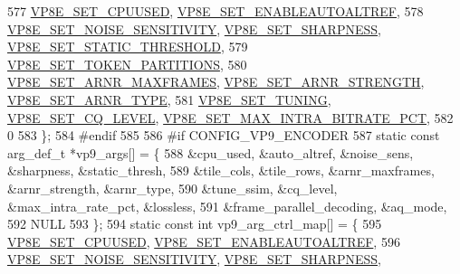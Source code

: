 \begin{DoxyCodeInclude}
{{{{{{{{{577   \hyperlink{group__vp8__encoder_gga6deae3d561c838952552c3d3756322eca953ff0eaa2fcdc2ecd627e449b026853}{VP8E\_SET\_CPUUSED}, \hyperlink{group__vp8__encoder_gga6deae3d561c838952552c3d3756322eca24a5530efabb8b4949d01622b1d72cb0}{VP8E\_SET\_ENABLEAUTOALTREF},
578   \hyperlink{group__vp8__encoder_gga6deae3d561c838952552c3d3756322eca3fa90cb70bade72af3c2d8d91471a36c}{VP8E\_SET\_NOISE\_SENSITIVITY}, \hyperlink{group__vp8__encoder_gga6deae3d561c838952552c3d3756322eca815930923fff388825ee3cc4ef69bb28}{VP8E\_SET\_SHARPNESS}, 
      \hyperlink{group__vp8__encoder_gga6deae3d561c838952552c3d3756322ecab34559df04d3d662616300ed0682dcfd}{VP8E\_SET\_STATIC\_THRESHOLD},
579   \hyperlink{group__vp8__encoder_gga6deae3d561c838952552c3d3756322eca462a4f14f39a6eb5c4a4004fc8d0ad75}{VP8E\_SET\_TOKEN\_PARTITIONS},
580   \hyperlink{group__vp8__encoder_gga6deae3d561c838952552c3d3756322eca628d73f1a69fadd8aa57e0dfef578da8}{VP8E\_SET\_ARNR\_MAXFRAMES}, \hyperlink{group__vp8__encoder_gga6deae3d561c838952552c3d3756322eca0a8c40a768af935ae73faa53355c3244}{VP8E\_SET\_ARNR\_STRENGTH}, 
      \hyperlink{group__vp8__encoder_gga6deae3d561c838952552c3d3756322eca4e0a0af58670012026c213083cd48f3a}{VP8E\_SET\_ARNR\_TYPE},
581   \hyperlink{group__vp8__encoder_gga6deae3d561c838952552c3d3756322eca126ccbe7bde63b59cec5ea68a82dd498}{VP8E\_SET\_TUNING}, \hyperlink{group__vp8__encoder_gga6deae3d561c838952552c3d3756322ecacd4f5b730bddb9788c3d0b82218ec503}{VP8E\_SET\_CQ\_LEVEL}, 
      \hyperlink{group__vp8__encoder_gga6deae3d561c838952552c3d3756322eca09c69ff4a3aabdb307d4f24027dfc4c1}{VP8E\_SET\_MAX\_INTRA\_BITRATE\_PCT},
582   0
583 \};
584 \textcolor{preprocessor}{#endif}
585 
586 \textcolor{preprocessor}{#if CONFIG\_VP9\_ENCODER}
587 \textcolor{keyword}{static} \textcolor{keyword}{const} arg\_def\_t *vp9\_args[] = \{
588   &cpu\_used, &auto\_altref, &noise\_sens, &sharpness, &static\_thresh,
589   &tile\_cols, &tile\_rows, &arnr\_maxframes, &arnr\_strength, &arnr\_type,
590   &tune\_ssim, &cq\_level, &max\_intra\_rate\_pct, &lossless,
591   &frame\_parallel\_decoding, &aq\_mode,
592   NULL
593 \};
594 \textcolor{keyword}{static} \textcolor{keyword}{const} \textcolor{keywordtype}{int} vp9\_arg\_ctrl\_map[] = \{
595   \hyperlink{group__vp8__encoder_gga6deae3d561c838952552c3d3756322eca953ff0eaa2fcdc2ecd627e449b026853}{VP8E\_SET\_CPUUSED}, \hyperlink{group__vp8__encoder_gga6deae3d561c838952552c3d3756322eca24a5530efabb8b4949d01622b1d72cb0}{VP8E\_SET\_ENABLEAUTOALTREF},
596   \hyperlink{group__vp8__encoder_gga6deae3d561c838952552c3d3756322eca3fa90cb70bade72af3c2d8d91471a36c}{VP8E\_SET\_NOISE\_SENSITIVITY}, \hyperlink{group__vp8__encoder_gga6deae3d561c838952552c3d3756322eca815930923fff388825ee3cc4ef69bb28}{VP8E\_SET\_SHARPNESS}, 
}}}}}}}}}
\end{DoxyCodeInclude}
